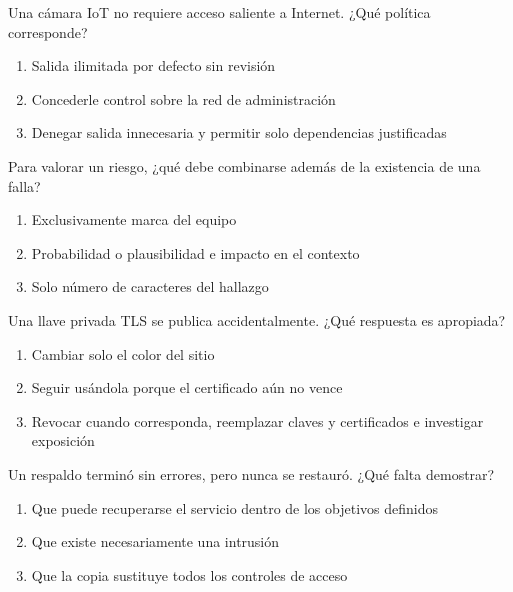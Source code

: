 \noindent\begin{minipage}{\linewidth}\setlength{\parskip}{4pt}\label{q:R-088}
Una cámara IoT no requiere acceso saliente a Internet. ¿Qué política corresponde?
\begin{enumerate}[label=\Alph*),nosep]
\item Salida ilimitada por defecto sin revisión
\item Concederle control sobre la red de administración
\item Denegar salida innecesaria y permitir solo dependencias justificadas
\end{enumerate}\end{minipage}\par\medskip

\noindent\begin{minipage}{\linewidth}\setlength{\parskip}{4pt}\label{q:R-089}
Para valorar un riesgo, ¿qué debe combinarse además de la existencia de una falla?
\begin{enumerate}[label=\Alph*),nosep]
\item Exclusivamente marca del equipo
\item Probabilidad o plausibilidad e impacto en el contexto
\item Solo número de caracteres del hallazgo
\end{enumerate}\end{minipage}\par\medskip

\noindent\begin{minipage}{\linewidth}\setlength{\parskip}{4pt}\label{q:R-090}
Una llave privada TLS se publica accidentalmente. ¿Qué respuesta es apropiada?
\begin{enumerate}[label=\Alph*),nosep]
\item Cambiar solo el color del sitio
\item Seguir usándola porque el certificado aún no vence
\item Revocar cuando corresponda, reemplazar claves y certificados e investigar exposición
\end{enumerate}\end{minipage}\par\medskip

\noindent\begin{minipage}{\linewidth}\setlength{\parskip}{4pt}\label{q:R-091}
Un respaldo terminó sin errores, pero nunca se restauró. ¿Qué falta demostrar?
\begin{enumerate}[label=\Alph*),nosep]
\item Que puede recuperarse el servicio dentro de los objetivos definidos
\item Que existe necesariamente una intrusión
\item Que la copia sustituye todos los controles de acceso
\end{enumerate}\end{minipage}\par\medskip

